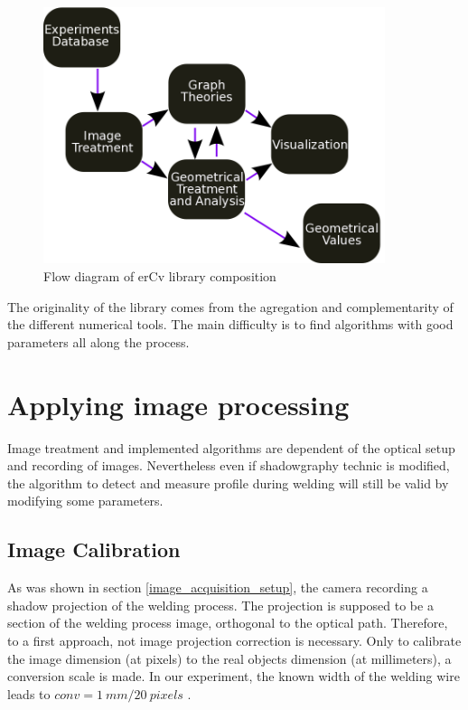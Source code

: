 \documentclass[12pt]{iopart}
\begin{document}
\begin{figure}
\begin{center}
\includegraphics[width=10cm]{images/schema-erCv.png}
\caption{{\small Flow diagram of erCv library composition}}
\label{fig::schema-erCv}
\end{center}
\end{figure}

The originality of the library comes from the agregation 
and complementarity of the different numerical tools.
The main difficulty is to find algorithms with good parameters all along the process.



\section{ Applying image processing}
\label{ applying_image_processing}
Image treatment and implemented algorithms are dependent of the optical setup and recording of images.
Nevertheless even if shadowgraphy technic is modified, the algorithm to detect and measure profile during
welding will still be valid by modifying some parameters.


\subsection{ Image Calibration}
\label{ image_calibration}

As was shown in section \ref{image_acquisition_setup}, the camera recording a 
shadow projection of the welding process. The projection is 
supposed to be a section of the welding process image, orthogonal to the optical path.
Therefore, to a first approach, not image projection 
correction is necessary. Only to calibrate the image dimension 
(at pixels) to the real objects dimension (at millimeters), a conversion scale is 
made. In our experiment, the known width of the welding wire leads to $conv = 1\ mm/ 20\ pixels$ . 
  
\end{document}
